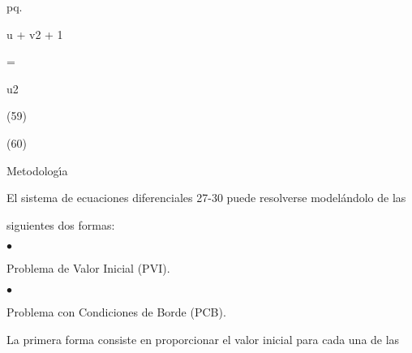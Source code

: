 \documentclass[a4paper,portrait,12pt]{article}
\begin{document}
\begin{flushleft}
pq.
\end{flushleft}


\begin{flushleft}
u + v2 + 1
\end{flushleft}


=





\begin{flushleft}
u2
\end{flushleft}





(59)


(60)










\begin{flushleft}
Metodolog\i{}́a
\end{flushleft}





\begin{flushleft}
El sistema de ecuaciones diferenciales 27-30 puede resolverse modelándolo de las
\end{flushleft}


\begin{flushleft}
siguientes dos formas:
\end{flushleft}


$\bullet$





\begin{flushleft}
Problema de Valor Inicial (PVI).
\end{flushleft}





$\bullet$





\begin{flushleft}
Problema con Condiciones de Borde (PCB).
\end{flushleft}





\begin{flushleft}
La primera forma consiste en proporcionar el valor inicial para cada una de las
\end{flushleft}
\end{document}
